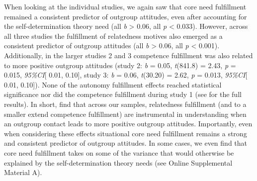 When looking at the individual studies, we again saw that core need
fulfillment remained a consistent predictor of outgroup attitudes, even
after accounting for the self-determination theory need (all
\textbar{}\textit{b}\textbar{} \textgreater{} 0.06, all \textit{p}
\textless{} 0.033). However, across all three studies the fulfillment of
relatedness motives also emerged as a consistent predictor of outgroup
attitudes (all \textbar{}\textit{b}\textbar{} \textgreater{} 0.06, all
\textit{p} \textless{} 0.001). Additionally, in the larger studies 2 and
3 competence fulfillment was also related to more positive outgroup
attitudes (study 2: \textit{b} = 0.05, \textit{t}(841.8) = 2.43,
\textit{p} = 0.015, \textit{95\%CI}{[} 0.01, 0.10{]}, study 3:
\textit{b} = 0.06, \textit{t}(30.20) = 2.62, \textit{p} = 0.013,
\textit{95\%CI}{[} 0.01, 0.10{]}). None of the autonomy fulfillment
effects reached statistical significance nor did the competence
fulfillment during study 1 (see  for the
full results). In short, find that across our samples, relatedness
fulfillment (and to a smaller extend competence fulfillment) are
instrumental in understanding when an outgroup contact leads to more
positive outgroup attitudes. Importantly, even when considering these
effects situational core need fulfillment remains a strong and
consistent predictor of outgroup attitudes. In some cases, we even find
that core need fulfillment takes on some of the variance that would
otherwise be explained by the self-determination theory needs (see
Online Supplemental Material A).
